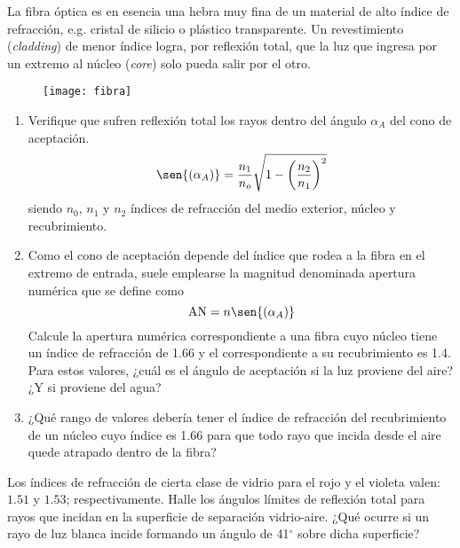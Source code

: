 \item
La fibra óptica es en esencia una hebra muy fina de un material de alto índice de refracción, e.g. cristal de silicio o plástico transparente.
Un revestimiento (\emph{cladding}) de menor índice logra, por reflexión total, que la luz que ingresa por un extremo al núcleo (\emph{core}) solo pueda salir por el otro.
\begin{figure}[ht]
	\centering{}\texttt{[image: fibra]}
\end{figure}
\begin{enumerate}
	\item Verifique que sufren reflexión total los rayos dentro del ángulo \(\alpha_A\) del cono de aceptación. 
	\[
		\sen{(\alpha_A)} = \frac{n_1}{n_o} \sqrt{1- \left( \frac{n_2}{n_1} \right)^2 }
	\]
	siendo \(n_0\), \(n_1\) y \(n_2\) índices de refracción del medio exterior, núcleo y recubrimiento.
	\item Como el cono de aceptación depende del índice que rodea a la fibra en el extremo de entrada, suele emplearse la magnitud denominada apertura numérica que se define como
	\[
		\text{AN} = n \sen{(\alpha_A)}
	\]
	Calcule la apertura numérica correspondiente a una fibra cuyo núcleo tiene un índice de refracción de \num{1.66} y el correspondiente a su recubrimiento es \num{1.4}.
	Para estos valores, ¿cuál es el ángulo de aceptación si la luz proviene del aire? ¿Y si proviene del agua?
	\item ¿Qué rango de valores debería tener el índice de refracción del recubrimiento de un núcleo cuyo índice es \num{1.66} para que todo rayo que incida desde el aire quede atrapado dentro de la fibra?
\end{enumerate}



\item Los índices de refracción de cierta clase de vidrio para el rojo y el violeta valen: $1.51$ y $1.53$; respectivamente.
Halle los ángulos límites de reflexión total para rayos que incidan en la superficie de separación vidrio-aire.
¿Qué ocurre si un rayo de luz blanca incide formando un ángulo de 41$^{\circ}$ sobre dicha superficie?
